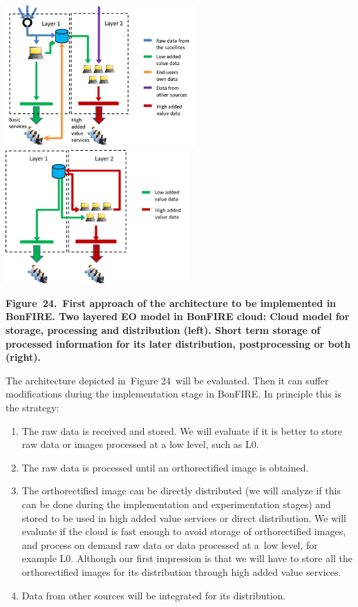 \documentclass[a4paper]{article}
\newcounter{saveenum}
\newcommand\liststyleLFOxxxiv{%
\renewcommand\theenumi{\arabic{enumi}}
\renewcommand\theenumii{\alph{enumii}}
\renewcommand\theenumiii{\roman{enumiii}}
\renewcommand\theenumiv{\arabic{enumiv}}
\renewcommand\labelenumi{\theenumi.}
\renewcommand\labelenumii{\theenumii.}
\renewcommand\labelenumiii{\theenumiii.}
\renewcommand\labelenumiv{\theenumiv.}
}
\begin{document}
\bigskip

{\centering 
\includegraphics[width=2.88056in,height=2.12708in]{out-img31.png} 
\includegraphics[width=2.77773in,height=2.01522in]{out-img32.png} \par}


\bigskip

{\centering\bfseries
\label{bkm:Ref378172684}Figure\ 24.\ First approach of the architecture
to be implemented in BonFIRE. Two layered EO model in BonFIRE cloud:
Cloud model for storage, processing and distribution (left). Short term
storage of processed information for its later distribution,
postprocessing or both (right).
\par}


\bigskip

The architecture depicted in\ Figure 24\ will be evaluated. Then it can
suffer modifications during the implementation stage in BonFIRE. In
principle this is the strategy:


\bigskip

\liststyleLFOxxxiv
\setcounter{saveenum}{\value{enumi}}
\begin{enumerate}
\setcounter{enumi}{\value{saveenum}}
\item The raw data is received and stored. We will evaluate if it is
better to store raw data or images processed at a low level, such as
L0.
\item The raw data is processed until an orthorectified image is
obtained.
\item The orthorectified image can be directly distributed (we will
analyze if this can be done during the implementation and
experimentation stages) and stored to be used in high added value
services or direct distribution. We will evaluate if the cloud is fast
enough to avoid storage of orthorectified images, and process on demand
raw data or data processed at a\ low level, for example L0. Although
our first impression is that we will have to store all the
orthorectified images for its distribution through high added value
services.
\item Data from other sources will be integrated for its distribution.
\end{enumerate}
\end{document}
